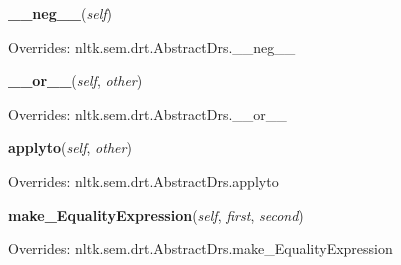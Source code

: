     \vspace{0.5ex}

\hspace{.8\funcindent}\begin{boxedminipage}{\funcwidth}

    \raggedright \textbf{\_\_neg\_\_}(\textit{self})

\setlength{\parskip}{2ex}
\setlength{\parskip}{1ex}
      Overrides: nltk.sem.drt.AbstractDrs.\_\_neg\_\_

    \end{boxedminipage}

    \vspace{0.5ex}

\hspace{.8\funcindent}\begin{boxedminipage}{\funcwidth}

    \raggedright \textbf{\_\_or\_\_}(\textit{self}, \textit{other})

\setlength{\parskip}{2ex}
\setlength{\parskip}{1ex}
      Overrides: nltk.sem.drt.AbstractDrs.\_\_or\_\_

    \end{boxedminipage}

    \vspace{0.5ex}

\hspace{.8\funcindent}\begin{boxedminipage}{\funcwidth}

    \raggedright \textbf{applyto}(\textit{self}, \textit{other})

\setlength{\parskip}{2ex}
\setlength{\parskip}{1ex}
      Overrides: nltk.sem.drt.AbstractDrs.applyto

    \end{boxedminipage}

    \vspace{0.5ex}

\hspace{.8\funcindent}\begin{boxedminipage}{\funcwidth}

    \raggedright \textbf{make\_EqualityExpression}(\textit{self}, \textit{first}, \textit{second})

\setlength{\parskip}{2ex}
\setlength{\parskip}{1ex}
      Overrides: nltk.sem.drt.AbstractDrs.make\_EqualityExpression

    \end{boxedminipage}

    \vspace{0.5ex}

